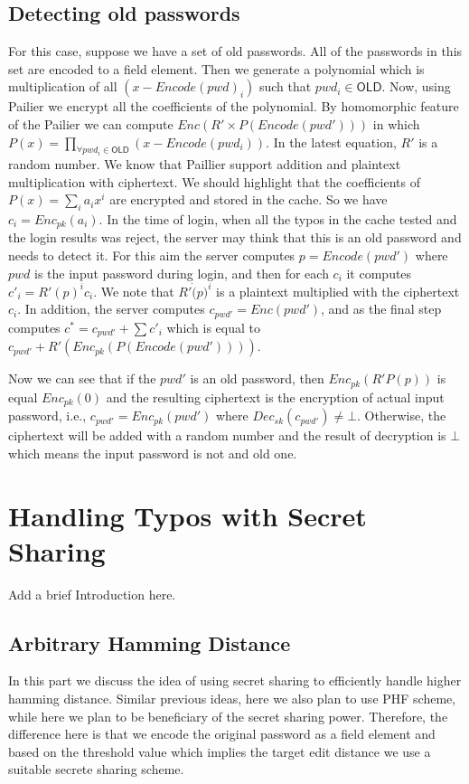 \subsection{Detecting old passwords}
For this case, suppose we have a set of old passwords. All of the passwords in this set are encoded to a field element. Then we generate a polynomial which is multiplication of all $ (x-Encode (pwd)_i) $ such that $ pwd_i\in \mathsf{OLD} $. Now, using Pailier we encrypt all the coefficients of the polynomial. By homomorphic feature of the Pailier we can compute $ Enc(R'\times P(Encode(pwd'))) $ in which $ P(x) = \prod _{\forall pwd_i\in \mathsf{OLD} }(x-Encode(pwd_i)) $. In the latest equation, $ R' $ is a random number. We know that Paillier support addition and plaintext multiplication with ciphertext. We should highlight that the coefficients of $ P(x) = \sum_{i} a_ix^i $ are encrypted and stored in the cache. So we have $c_i =  Enc_{pk}(a_i) $. In the time of login, when all the typos in the cache tested and the login results was reject, the server may think that this is an old password and needs to detect it. For this aim the server computes $ p =Encode(pwd') $ where $ pwd $ is the input password during login, and then for each $ c_i $ it computes $ c'_i =  R'(p)^i c_i $. We note that $ R' \dot (p)^i $ is a plaintext multiplied with the ciphertext $ c_i $. In addition, the server computes $ c_{pwd'} = Enc(pwd') $, and as the final step computes $ c^* = c_{pwd'} + \sum c'_i$ which is equal to $ c_{pwd'} + R'(Enc_{pk} (P(Encode(pwd')))) $. 


Now we can see that if the $ pwd' $ is an old password, then $ Enc_{pk}(R' P(p)) $ is equal $ Enc_{pk}(0) $ and the resulting ciphertext is the encryption of actual input password, i.e., $ c_{pwd'} = Enc_{pk}(pwd') $ where $ Dec_{sk}(c_{pwd'}) \neq \bot $. Otherwise, the ciphertext will be added with a random number and the result of decryption is $ \bot $ which means the input password is not and old one. 


\section {Handling Typos with Secret Sharing} 
{\color{blue} Add a brief Introduction here. }
\subsection{Arbitrary Hamming Distance}
In this part we discuss the idea of using secret sharing to efficiently handle higher hamming distance. Similar previous ideas, here we also plan to use PHF scheme, while here we plan to be beneficiary of the secret sharing power. Therefore, the difference here is that we encode the original password as a field element and based on the threshold value which implies the target edit distance we use a suitable secrete sharing scheme. 

